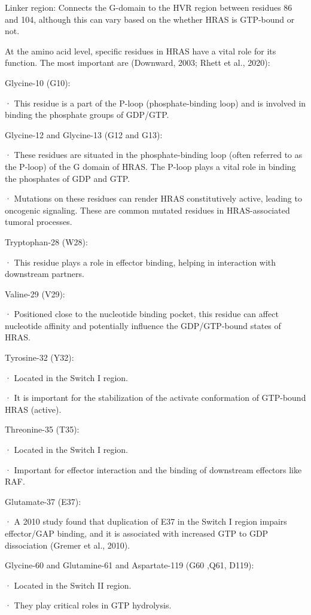 \documentclass{article}
\begin{document}
Linker region: Connects the G-domain to the HVR region between residues 86 and 104, although this can vary based on the whether HRAS is GTP-bound or not.

 At the amino acid level, specific residues in HRAS have a vital role for its function. The most important are (Downward, 2003; Rhett et al., 2020):

Glycine-10 (G10):

· This residue is a part of the P-loop (phosphate-binding loop) and is involved in binding the phosphate groups of GDP/GTP.

Glycine-12 and Glycine-13 (G12 and G13):

· These residues are situated in the phosphate-binding loop (often referred to as the P-loop) of the G domain of HRAS. The P-loop plays a vital role in binding the phosphates of GDP and GTP.

· Mutations on these residues can render HRAS constitutively active, leading to oncogenic signaling. These are common mutated residues in HRAS-associated tumoral processes.

Tryptophan-28 (W28):

· This residue plays a role in effector binding, helping in interaction with downstream partners.

Valine-29 (V29):

· Positioned close to the nucleotide binding pocket, this residue can affect nucleotide affinity and potentially influence the GDP/GTP-bound states of HRAS.

Tyrosine-32 (Y32):

· Located in the Switch I region.

· It is important for the stabilization of the activate conformation of GTP-bound HRAS (active).

Threonine-35 (T35):

· Located in the Switch I region.

· Important for effector interaction and the binding of downstream effectors like RAF.

Glutamate-37 (E37):

· A 2010 study found that duplication of E37 in the Switch I region impairs effector/GAP binding, and it is associated with increased GTP to GDP dissociation (Gremer et al., 2010).

Glycine-60 and Glutamine-61 and Aspartate-119 (G60 ,Q61, D119):

· Located in the Switch II region.

· They play critical roles in GTP hydrolysis. 
\end{document}
